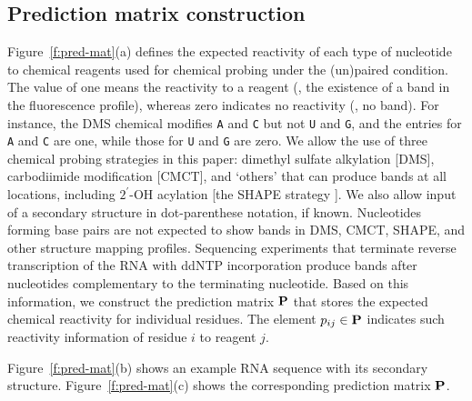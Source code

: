 \subsection{Prediction matrix construction}\label{ss:pred_mat}
Figure~\ref{f:pred-mat}(a) defines the expected reactivity of each type of nucleotide to chemical reagents used for chemical probing under the (un)paired condition. The value of one means the reactivity to a reagent (\ie, the existence of a band in the fluorescence profile), whereas zero indicates no reactivity (\ie, no band). For instance,  the DMS chemical modifies \texttt{A} and \texttt{C} but not \texttt{U} and \texttt{G}, and the entries for \texttt{A} and \texttt{C} are one, while those for \texttt{U} and \texttt{G} are zero. We allow the use of three chemical probing strategies in this paper: dimethyl sulfate alkylation \citep{tijerina2007dms} [DMS], carbodiimide modification \citep{walczak} [CMCT], and `others' that can produce bands at all locations, including $2^{\prime}$-OH acylation [the SHAPE strategy \citep{wilkinson2005}]. We also allow input of a secondary structure in dot-parenthese notation, if known. Nucleotides forming base pairs are not expected to show bands in DMS, CMCT, SHAPE, and other structure mapping profiles. Sequencing experiments that terminate reverse transcription of the RNA with ddNTP incorporation produce bands after nucleotides complementary to the terminating nucleotide. Based on this information, we construct the prediction matrix ${\mathbf{P}}$ that stores the expected chemical reactivity for individual residues. The element $p_{ij} \in {\mathbf{P}}$ indicates such reactivity information of residue $i$ to reagent $j$.

%

Figure~\ref{f:pred-mat}(b) shows an example RNA sequence with its secondary structure. Figure~\ref{f:pred-mat}(c) shows the corresponding prediction matrix ${\mathbf{P}}$.


